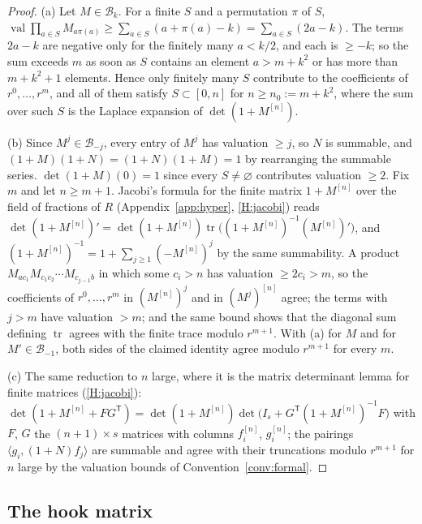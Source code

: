 \documentclass[11pt]{article}
\theoremstyle{definition}
\theoremstyle{remark}
\newcommand{\tr}{\operatorname{tr}}
\begin{document}
\begin{proof}
(a) Let $M\in\mathcal B_k$. For a finite $S$ and a permutation $\pi$ of $S$, $\operatorname{val}\prod_{a\in S}M_{a\pi(a)}\ge\sum_{a\in S}(a+\pi(a)-k)=\sum_{a\in S}(2a-k)$. The terms $2a-k$ are negative only for the finitely many $a<k/2$, and each is $\ge-k$; so the sum exceeds $m$ as soon as $S$ contains an element $a>m+k^2$ or has more than $m+k^2+1$ elements. Hence only finitely many $S$ contribute to the coefficients of $r^0,\dots,r^m$, and all of them satisfy $S\subset[0,n]$ for $n\ge n_0:=m+k^2$, where the sum over such $S$ is the Laplace expansion of $\det(1+M^{[n]})$.

(b) Since $M^j\in\mathcal B_{-j}$, every entry of $M^j$ has valuation $\ge j$, so $N$ is summable, and $(1+M)(1+N)=(1+N)(1+M)=1$ by rearranging the summable series. $\det(1+M)(0)=1$ since every $S\ne\varnothing$ contributes valuation $\ge2$. Fix $m$ and let $n\ge m+1$. Jacobi's formula for the finite matrix $1+M^{[n]}$ over the field of fractions of $R$ (Appendix~\ref{app:hyper}, \ref{H:jacobi}) reads $\det(1+M^{[n]})'=\det(1+M^{[n]})\tr\bigl((1+M^{[n]})^{-1}(M^{[n]})'\bigr)$, and $(1+M^{[n]})^{-1}=1+\sum_{j\ge1}(-M^{[n]})^j$ by the same summability. A product $M_{ac_1}M_{c_1c_2}\cdots M_{c_{j-1}b}$ in which some $c_i>n$ has valuation $\ge2c_i>m$, so the coefficients of $r^0,\dots,r^m$ in $(M^{[n]})^j$ and in $(M^j)^{[n]}$ agree; the terms with $j>m$ have valuation $>m$; and the same bound shows that the diagonal sum defining $\tr$ agrees with the finite trace modulo $r^{m+1}$. With (a) for $M$ and for $M'\in\mathcal B_{-1}$, both sides of the claimed identity agree modulo $r^{m+1}$ for every $m$.

(c) The same reduction to $n$ large, where it is the matrix determinant lemma for finite matrices (\ref{H:jacobi}): $\det(1+M^{[n]}+FG^{\mathsf T})=\det(1+M^{[n]})\det\bigl(I_s+G^{\mathsf T}(1+M^{[n]})^{-1}F\bigr)$ with $F$, $G$ the $(n+1)\times s$ matrices with columns $f_i^{[n]}$, $g_i^{[n]}$; the pairings $\langle g_i,(1+N)f_j\rangle$ are summable and agree with their truncations modulo $r^{m+1}$ for $n$ large by the valuation bounds of Convention~\ref{conv:formal}.
\end{proof}

\subsection{The hook matrix}
\end{document}
